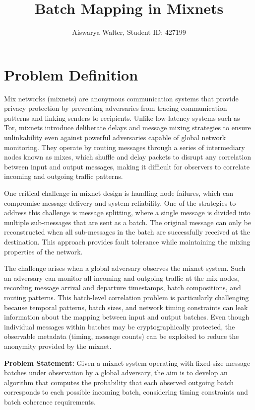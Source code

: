 \documentclass{article}
\title{Batch Mapping in Mixnets}
\author{Aiswarya Walter, Student ID: 427199}
\date{}
\begin{document}
\maketitle

\section{Problem Definition}
\label{sec:problem}

Mix networks (mixnets) are anonymous communication systems that 
provide privacy protection by preventing 
adversaries from tracing communication patterns and 
linking senders to recipients. Unlike low-latency 
systems such as Tor, mixnets introduce deliberate 
delays and message mixing strategies to ensure 
 unlinkability even against powerful 
adversaries capable of global network monitoring. 
They operate by routing messages through a series 
of intermediary nodes known as mixes, which 
shuffle and delay packets to disrupt any 
correlation between input and output messages, 
making it difficult for observers to correlate 
incoming and outgoing traffic patterns.

One critical challenge in mixnet design is handling node failures, which 
can compromise message delivery and system reliability. One of the strategies 
to address this challenge is message splitting, where a single  
message is divided into multiple sub-messages that are sent as a batch. 
The original message can only be reconstructed when all sub-messages in 
the batch are successfully received at the destination. This approach 
provides fault tolerance while maintaining the mixing properties of 
the network.

The challenge arises when a global adversary observes 
the mixnet system. Such an adversary can monitor all incoming and outgoing 
traffic at the mix nodes, recording message arrival and departure timestamps, 
batch compositions, and routing patterns. This batch-level 
correlation problem is particularly challenging because 
temporal patterns, batch sizes, and network timing constraints can leak 
information about the mapping between input and output batches. Even 
though individual messages within batches may be cryptographically 
protected, the observable metadata (timing, message counts) 
can be exploited to reduce the anonymity provided by the mixnet.

\textbf{Problem Statement:} Given a mixnet system operating with fixed-size 
message batches under observation by a global adversary, the aim is to develop 
an algorithm that computes the probability 
that each observed outgoing batch corresponds to each possible incoming 
batch, considering timing constraints and batch coherence requirements.
\end{document}
